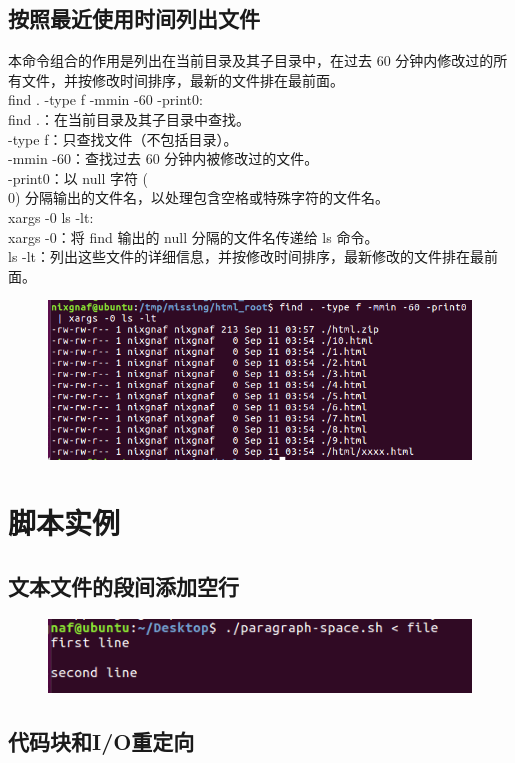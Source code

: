 \documentclass{article}
\begin{document}
\subsection{按照最近使用时间列出文件}
本命令组合的作用是列出在当前目录及其子目录中，在过去 60 分钟内修改过的所有文件，并按修改时间排序，最新的文件排在最前面。\\
find . -type f -mmin -60 -print0:\\
find .：在当前目录及其子目录中查找。\\
-type f：只查找文件（不包括目录）。\\
-mmin -60：查找过去 60 分钟内被修改过的文件。\\
-print0：以 null 字符 (\\0) 分隔输出的文件名，以处理包含空格或特殊字符的文件名。\\
xargs -0 ls -lt:\\
xargs -0：将 find 输出的 null 分隔的文件名传递给 ls 命令。\\
ls -lt：列出这些文件的详细信息，并按修改时间排序，最新修改的文件排在最前面。\\
\begin{figure}[h]
    \centering
    \includegraphics[width=0.5\linewidth]{image24.png}
\end{figure}

\section{脚本实例}

\subsection{文本文件的段间添加空行}

\begin{figure}[h]
    \centering
    \includegraphics[width=0.5\linewidth]{image6.png}
\end{figure}

\subsection{代码块和I/O重定向}

\end{document}
